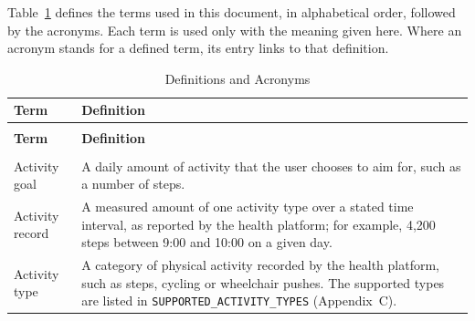 \documentclass[12pt]{article}
\begin{document}
Table~\ref{tab:DefinitionsAndAcronyms} defines the terms used in this
document, in alphabetical order, followed by the acronyms. Each term is used
only with the meaning given here. Where an acronym stands for a defined term,
its entry links to that definition.

\begin{longtable}{>{\raggedright\arraybackslash}p{} p{}}
  \caption{Definitions and Acronyms} \label{tab:DefinitionsAndAcronyms}                                                                                                                                                        \\
\toprule
  \textbf{Term}                                      & \textbf{Definition}                                                                                                                                                     \\
\midrule
  \endfirsthead
  \multicolumn{2}{l}{\textit{Table~\ref{tab:DefinitionsAndAcronyms} continued}}                                                                                                                                                \\
  \toprule
  \textbf{Term}                                      & \textbf{Definition}                                                                                                                                                     \\
  \midrule
  \endhead
\bottomrule
  \endfoot
  \multicolumn{2}{l}{\textit{Terms}}                                                                                                                                                                                           \\
  \midrule
  Activity goal                                      & A daily amount of activity that the user chooses to aim for, such as a number of steps.                                                                                 \\
  Activity record                                    & A measured amount of one activity type over a stated time interval, as reported by the health platform; for example, 4,200 steps between 9:00 and 10:00 on a given day. \\
  Activity type                                      & A category of physical activity recorded by the health platform, such as steps, cycling or wheelchair pushes. The supported types are listed in \texttt{SUPPORTED\_ACTIVITY\_TYPES} (Appendix~C). \\

\end{longtable}
\end{document}
